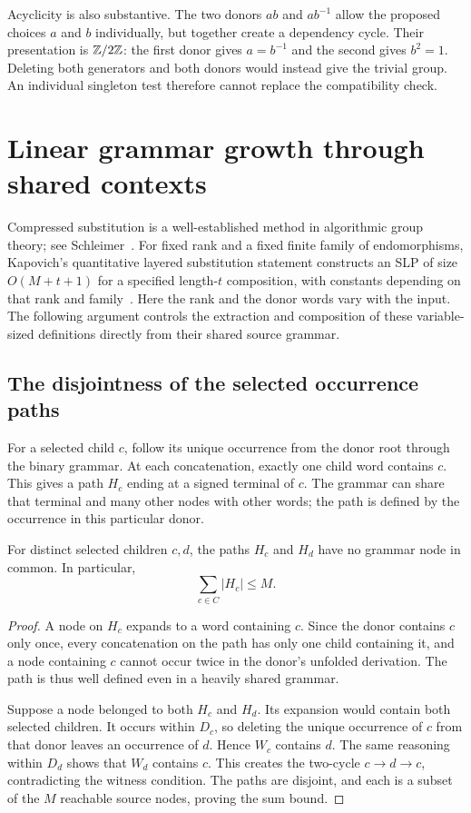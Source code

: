 Acyclicity is also substantive. The two donors $ab$ and $ab^{-1}$ allow
the proposed choices $a$ and $b$ individually, but together create a
dependency cycle. Their presentation is $\mathbb Z/2\mathbb Z$: the first donor gives
$a=b^{-1}$ and the second gives $b^2=1$. Deleting both generators and
both donors would instead give the trivial group. An individual
singleton test therefore cannot replace the compatibility check.

\section{Linear grammar growth through shared contexts}
\label{alg:compression}

Compressed substitution is a well-established method in algorithmic
group theory; see Schleimer~\cite{Schleimer2008}. For fixed rank and a
fixed finite family of endomorphisms, Kapovich's quantitative layered
substitution statement constructs an SLP of size $O(M+t+1)$ for a
specified length-$t$ composition, with constants depending on that rank
and family~\cite[Proposition~3.2]{Kapovich2026}. Here the rank and the
donor words vary with the input. The following argument controls the
extraction and composition of these variable-sized definitions directly
from their shared source grammar.

\subsection{The disjointness of the selected occurrence paths}

For a selected child $c$, follow its unique occurrence from the donor
root through the binary grammar. At each concatenation, exactly one
child word contains $c$. This gives a path $H_c$ ending at a signed
terminal of $c$. The grammar can share that terminal and many other
nodes with other words; the path is defined by the occurrence in this
particular donor.

\begin{lemma}
\label{alg:hole-paths}
For distinct selected children $c,d$, the paths $H_c$ and $H_d$ have
no grammar node in common. In particular,
\[
 \sum_{c\in C}|H_c|\le M.
\]
\end{lemma}

\begin{proof}
A node on $H_c$ expands to a word containing $c$. Since the donor
contains $c$ only once, every concatenation on the path has only one
child containing it, and a node containing $c$ cannot occur twice in
the donor's unfolded derivation. The path is thus well defined even
in a heavily shared grammar.

Suppose a node belonged to both $H_c$ and $H_d$. Its expansion would
contain both selected children. It occurs within $D_c$, so deleting
the unique occurrence of $c$ from that donor leaves an occurrence of
$d$. Hence $W_c$ contains $d$. The same reasoning within $D_d$ shows
that $W_d$ contains $c$. This creates the two-cycle $c\to d\to c$,
contradicting the witness condition. The paths are disjoint, and each
is a subset of the $M$ reachable source nodes, proving the sum bound.
\end{proof}

